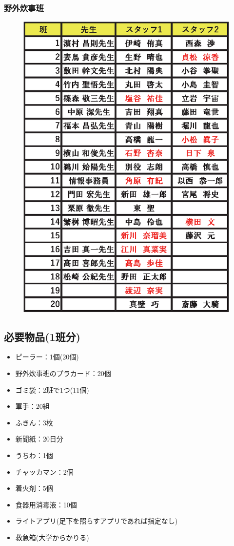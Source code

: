 \subsubsection{野外炊事班}
\begin{figure}[H]
\begin{center}
\includegraphics[scale=0.9]{./09/yagaisuijihanwake.eps}
\end{center}
\end{figure}


\subsection{必要物品(1班分)}
\begin{itemize}
  \item ピーラー：1個(20個)
  \item 野外炊事班のプラカード：20個
  \item ゴミ袋：2班で1つ(11個)
  \item 軍手：20組
  \item ふきん：3枚
  \item 新聞紙：20日分
  \item うちわ：1個
  \item チャッカマン：2個
  \item 着火剤：5個
  \item 食器用消毒液：10個
  \item ライトアプリ(足下を照らすアプリであれば指定なし)
  \item 救急箱(大学からかりる)
\end{itemize}


